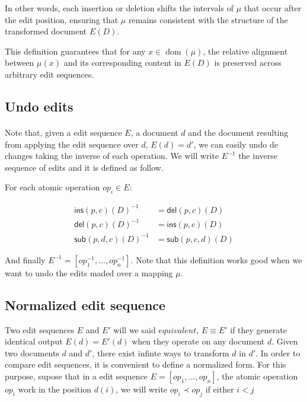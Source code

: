 \documentclass{article}
\begin{document}
In other words, each insertion or deletion shifts the intervals of $\mu$ that occur 
after the edit position, ensuring that $\mu$ remains consistent with the structure of 
the transformed document $E(D)$.

This definition guarantees that for any $x \in \operatorname{dom}(\mu)$,
the relative alignment between $\mu(x)$ and its corresponding content in $E(D)$ 
is preserved across arbitrary edit sequences.

\subsection{Undo edits}

\paragraph{}Note that, given a edit sequence $E$, a document $d$ and the document resulting from applying the edit sequence over $d$, $E(d) = d'$, we can easily undo de changes taking the inverse of each operation. We will write  $E^{-1}$ the inverse sequence of edits and it is defined as follow.

For each atomic operation $op_i \in E$: 

\begin{align*}
	\mathsf{ins}(p,c)(D)^{-1} &= \mathsf{del}(p, c)(D) \\
	\mathsf{del}(p,c)(D)^{-1} &= \mathsf{ins}(p, c)(D) \\
	\mathsf{sub}(p, d, c)(D)^{-1} &= \mathsf{sub}(p, c, d)(D)
\end{align*}

And finally  $E^{-1} = [op_1^{-1}, \ldots, op_n^{-1}]$. Note that this definition works good when we want to undo the edits maded over a mapping $\mu$.
 
 
\subsection{Normalized edit sequence}

Two edit sequences $E$ and  $E'$ will we said $\textit{equivalent}$, $E \equiv E'$ if they generate identical output  $E(d) = E'(d)$ when they operate on any document $d$. Given two documents $d$ and $d'$, there exist infinte ways to transform $d$ in $d'$. In order to compare edit sequences, it is convenient to define a normalized form. For this purpose, supose that in a edit sequence $E = [op_1, \ldots, op_n]$, the atomic operation $op_i$ work in the position $d(i)$, we will write $op_i \prec op_j$ if either $i < j$
\end{document}
